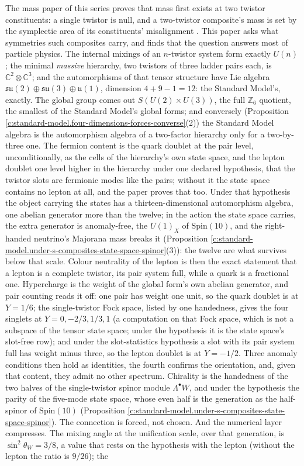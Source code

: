 \documentclass[11pt]{article}
\theoremstyle{definition}
\theoremstyle{plain}
\providecommand{\C}{}\renewcommand{\C}{\mathbb{C}}
\providecommand{\su}{}\renewcommand{\su}{\mathfrak{su}}
\providecommand{\uu}{}\renewcommand{\uu}{\mathfrak{u}}
\begin{document}
\label{c:note.standard-model.setting-introduction}
The mass paper of this series proves that mass first exists at two twistor constituents: a single twistor is null, and a two-twistor composite's mass is set by the symplectic area of its constituents' misalignment \cite{ButlerT11}. This paper asks what symmetries such composites carry, and finds that the question answers most of particle physics. The internal mixings of an $n$-twistor system form exactly $U(n)$; the minimal \emph{massive} hierarchy, two twistors of three ladder pairs each, is $\C^{2} \otimes \C^{3}$; and the automorphisms of that tensor structure have Lie algebra $\su(2) \oplus \su(3) \oplus \uu(1)$, dimension $4 + 9 - 1 = 12$: the Standard Model's, exactly. The global group comes out $S(U(2) \times U(3))$, the full $\mathbb{Z}_{6}$ quotient, the smallest of the Standard Model's global forms; and conversely (Proposition \ref{c:standard-model.four-dimensions-forces-converse}(2)) the Standard Model algebra is the automorphism algebra of a two-factor hierarchy only for a two-by-three one. The fermion content is the quark doublet at the pair level, unconditionally, as the cells of the hierarchy's own state space, and the lepton doublet one level higher in the hierarchy under one declared hypothesis, that the twistor slots are fermionic modes like the pairs; without it the state space contains no lepton at all, and the paper proves that too. Under that hypothesis the object carrying the states has a thirteen-dimensional automorphism algebra, one abelian generator more than the twelve; in the action the state space carries, the extra generator is anomaly-free, the $U(1)_{X}$ of $\mathrm{Spin}(10)$, and the right-handed neutrino's Majorana mass breaks it (Proposition \ref{c:standard-model.under-s-composites-state-space-spinor}(3)): the twelve are what survives below that scale. Colour neutrality of the lepton is then the exact statement that a lepton is a complete twistor, its pair system full, while a quark is a fractional one. Hypercharge is the weight of the global form's own abelian generator, and pair counting reads it off: one pair has weight one unit, so the quark doublet is at $Y = 1/6$; the single-twistor Fock space, listed by one handedness, gives the four singlets at $Y = 0, -2/3, 1/3, 1$ (a computation on that Fock space, which is not a subspace of the tensor state space; under the hypothesis it is the state space's slot-free row); and under the slot-statistics hypothesis a slot with its pair system full has weight minus three, so the lepton doublet is at $Y = -1/2$. Three anomaly conditions then hold as identities, the fourth confirms the orientation, and, given that content, they admit no other spectrum. Chirality is the handedness of the two halves of the single-twistor spinor module $\Lambda^{\bullet}W$, and under the hypothesis the parity of the five-mode state space, whose even half is the generation as the half-spinor of $\mathrm{Spin}(10)$ (Proposition \ref{c:standard-model.under-s-composites-state-space-spinor}). The connection is forced, not chosen. And the numerical layer compresses. The mixing angle at the unification scale, over that generation, is $\sin^{2}\theta_{W} = 3/8$, a value that rests on the hypothesis with the lepton (without the lepton the ratio is $9/26$); the 
\end{document}
